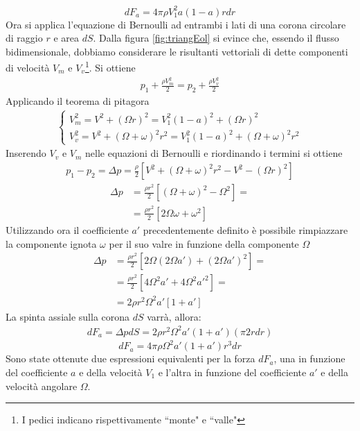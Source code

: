 \begin{equation}\label{eq:forza1}
dF_a = 4 \pi \rho	V_1^2 a \left( 1-a \right) r dr
\end{equation}
Ora si applica l'equazione di Bernoulli ad entrambi i lati di una corona circolare di raggio $r$ e area $dS$. Dalla figura \ref{fig:triangEol} si evince che, essendo il flusso bidimensionale, dobbiamo considerare le risultanti vettoriali di dette componenti di velocità $V_m$ e $V_v$\footnote{I pedici indicano rispettivamente ``monte" e ``valle"}. Si ottiene
\begin{align*}
p_1 + \frac{\rho V_m^2}{2} = p_2 + \frac{\rho V_v^2}{2}
\end{align*}
Applicando il teorema di pitagora
\begin{align*}
\begin{cases}
V_m^2 = V^2 + \left( \Omega r \right)^2 = V_1^2 \left(1-a \right)^2 + \left( \Omega r \right)^2\\
V_v^2 = V^2 + \left( \Omega + \omega \right)^2 r^2= V_1^2 \left(1-a \right)^2 + \left( \Omega + \omega \right)^2 r^2
\end{cases}
\end{align*}
Inserendo $V_v$ e $V_m$ nelle equazioni di Bernoulli e riordinando i termini si ottiene
\begin{align*}
p_1 - p_2 = \Delta p = \frac{\rho}{2} \left[ V^2 + \left( \Omega + \omega \right)^2 r^2 - V^2 - \left( \Omega r \right)^2 \right]
\end{align*}
\begin{align*}
\Delta p &= \frac{\rho r^2}{2} \left[ \left( \Omega + \omega \right)^2 - \Omega^2 \right]= \\
&= \frac{\rho r^2}{2} \left[ 2 \Omega \omega + \omega^2 \right]
\end{align*}
Utilizzando ora il coefficiente $a'$ precedentemente definito è possibile rimpiazzare la componente ignota $\omega$ per il suo valre in funzione della componente $\Omega$
\begin{align*}
\Delta p &= \frac{\rho r^2}{2} \left[ 2 \Omega \left( 2 \Omega a'\right) + \left( 2 \Omega a' \right)^2 \right]=\\
&= \frac{\rho r^2}{2} \left[ 4 \Omega^2 a' + 4 \Omega^2 a'^2 \right] = \\
&= 2 \rho r^2 \Omega^2 a' \left[ 1+a' \right]
\end{align*}
La spinta assiale sulla corona $dS$ varrà, allora:
\begin{align*}
dF_a = \Delta p dS = 2 \rho r^2 \Omega^2 a' \left(1 + a' \right) \left( \pi 2 r dr \right)
\end{align*}
\begin{equation}\label{eq:forza2}
dF_a = 4 \pi \rho \Omega^2 a' \left( 1+ a' \right) r^3 dr
\end{equation}
Sono state ottenute due espressioni equivalenti per la forza $dF_a$, una in funzione del coefficiente $a$ e della velocità $V_1$ e l'altra in funzione del coefficiente $a'$ e della velocità angolare $\Omega$. 

